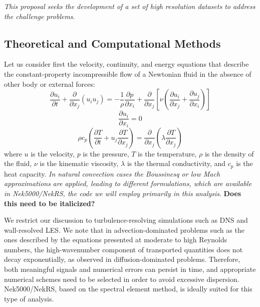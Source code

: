
\textit{This proposal seeks the development of a set of high resolution
datasets to address the challenge problems}.

\vspace{-.25in}
\subsection{Theoretical and Computational Methods}
\vspace{-.2in}

Let us consider first  the velocity, continuity, and energy equations that
describe the constant-property incompressible flow of a Newtonian fluid in the
absence of other body or external forces:
\begin{equation}
\frac{\partial  u_i  }{\partial t} +  \frac{\partial}{\partial x_j} \left( u_i u_j \right) =-\frac{1}{\rho} \frac{\partial p}{\partial x_i} + \frac{\partial}{\partial x_j} \left[ \nu \left( \frac{\partial u_i}{\partial x_j} +\frac{\partial u_j}{\partial x_i} \right) \right]
\label{UEqn}
\end{equation}
\begin{equation}
\frac{\partial u_i}{\partial x_i} = 0
\label{rhoEqn}
\end{equation}
\begin{equation}
\rho c_p \left( \frac{\partial T }{\partial t} + u_j \frac{\partial T}{\partial x_j} \right) = \frac{\partial }{\partial x_j} \left( \lambda \frac{\partial T}{\partial x_j} \right)
\label{EEqn}
\end{equation}
where $u$ is the velocity, $p$ is the pressure, $T$ is the temperature, $\rho$
is the  density of the fluid, $\nu$ is the kinematic viscosity, $\lambda$ is
the thermal conductivity, and $c_p$ is the heat capacity. \textit{In natural
convection cases the Boussinesq or low Mach approximations}
\cite{tomboulides1997numerical} \textit{are applied, leading to different
formulations, which are available in Nek5000/NekRS, the code we will employ
primarily in this analysis}. {\bf Does this need to be italicized?}

We restrict our discussion to turbulence-resolving simulations such as DNS and
wall-resolved LES. We note that in advection-dominated problems such as the
ones described by the equations presented at moderate to high Reynolds numbers,
the high-wavenumber component of transported quantities does not decay
exponentially, as observed in diffusion-dominated problems. Therefore, both
meaningful signals and numerical errors can persist in time, and appropriate
numerical schemes need to be selected in order to avoid excessive dispersion.
Nek5000/NekRS, based on the spectral element method, is ideally suited for this
type of analysis.

